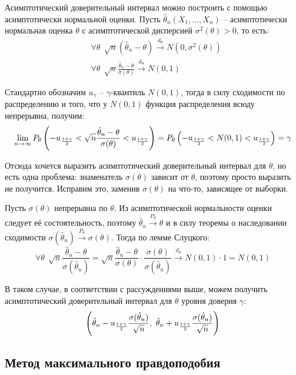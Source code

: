 \begin{note}
    Асимптотический доверительный интервал можно построить с помощью асимптотически нормальной оценки. Пусть $\hat{\theta}_n(X_1, \dots, X_n)$ -- асимптотически нормальная оценка $\theta$ с асимптотической дисперсией $\sigma^2(\theta) > 0$, то есть:
    \begin{align*}
        & \forall \theta \ \ \sqrt{n}(\hat{\theta}_n - \theta) \xrightarrow{d_\theta} N(0, \sigma^2(\theta))
        \\
        & \forall \theta \ \ \sqrt{n} \frac{\hat{\theta}_n - \theta}{\sigma(\theta)} \xrightarrow{d_\theta} N(0, 1)
    \end{align*}

    Стандартно обозначим $u_\gamma$ -- $\gamma$-квантиль $N(0, 1)$, тогда в силу сходимости по распределению и того, что у $N(0, 1)$ функция распределения всюду непрерывна, получим:
    \[
        \lim_{n \to \infty} P_\theta \left(-u_{\frac{1+\gamma}{2}} < \sqrt{n} \frac{\hat{\theta}_n - \theta}{\sigma(\theta)} < u_{\frac{1+\gamma}{2}}\right) = P_\theta \left(-u_{\frac{1+\gamma}{2}} < N(0, 1) < u_{\frac{1+\gamma}{2}}\right) = \gamma
    \]

    Отсюда хочется выразить асимптотический доверительный интервал для $\theta$, но есть одна проблема: знаменатель $\sigma(\theta)$ зависит от $\theta$, поэтому просто выразить не получится. Исправим это, заменив $\sigma(\theta)$ на что-то, зависящее от выборки.

    Пусть $\sigma(\theta)$ непрерывна по $\theta$. Из асимптотической нормальности оценки следует её состоятельность, поэтому $\hat{\theta}_n \xrightarrow{P_\theta} \theta$ и в силу теоремы о наследовании сходимости $\sigma(\hat{\theta}_n) \xrightarrow{P_\theta} \sigma(\theta)$. Тогда по лемме Слуцкого:
    \[
        \forall \theta \ \ \sqrt{n} \frac{\hat{\theta}_n - \theta}{\sigma(\hat{\theta}_n)} = \sqrt{n} \frac{\hat{\theta}_n - \theta}{\sigma(\theta)} \cdot \frac{\sigma(\theta)}{\sigma(\hat{\theta}_n)} \xrightarrow{d_\theta} N(0, 1) \cdot 1 = N(0, 1)
    \]

    В таком случае, в соответствии с рассуждениями выше, можем получить асимптотический доверительный интервал для $\theta$ уровня доверия $\gamma$:
    \[
        \left(\hat{\theta}_n - u_{\frac{1+\gamma}{2}} \frac{\sigma(\hat{\theta}_n)}{\sqrt{n}},\ \hat{\theta}_n + u_{\frac{1+\gamma}{2}} \frac{\sigma(\hat{\theta}_n)}{\sqrt{n}}\right)
    \]
\end{note}

\subsection{Метод максимального правдоподобия}

